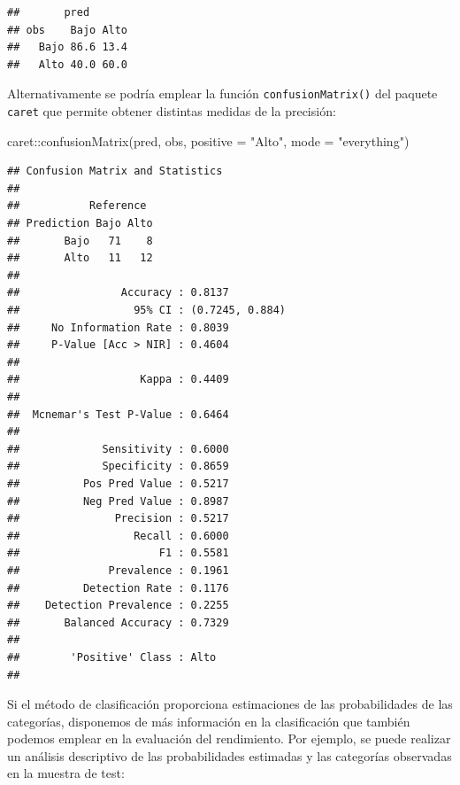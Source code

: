 \documentclass[
  spanish,
]{book}
\newenvironment{Shaded}{\begin{snugshade}}{\end{snugshade}}
\newcommand{\AttributeTok}[1]{\textcolor[rgb]{0.77,0.63,0.00}{#1}}
\newcommand{\FunctionTok}[1]{\textcolor[rgb]{0.00,0.00,0.00}{#1}}
\newcommand{\NormalTok}[1]{#1}
\newcommand{\SpecialCharTok}[1]{\textcolor[rgb]{0.00,0.00,0.00}{#1}}
\newcommand{\StringTok}[1]{\textcolor[rgb]{0.31,0.60,0.02}{#1}}
\theoremstyle{break}
\theoremstyle{definition}
\theoremstyle{definition}
\theoremstyle{definition}
\theoremstyle{definition}
\theoremstyle{remark}
\begin{document}
\begin{verbatim}
##       pred
## obs    Bajo Alto
##   Bajo 86.6 13.4
##   Alto 40.0 60.0
\end{verbatim}

Alternativamente se podría emplear la función \texttt{confusionMatrix()} del paquete \texttt{caret} que permite obtener distintas medidas de la precisión:

\begin{Shaded}
\begin{Highlighting}[]
\NormalTok{caret}\SpecialCharTok{::}\FunctionTok{confusionMatrix}\NormalTok{(pred, obs, }\AttributeTok{positive =} \StringTok{"Alto"}\NormalTok{, }\AttributeTok{mode =} \StringTok{"everything"}\NormalTok{)}
\end{Highlighting}
\end{Shaded}

\begin{verbatim}
## Confusion Matrix and Statistics
## 
##           Reference
## Prediction Bajo Alto
##       Bajo   71    8
##       Alto   11   12
##                                          
##                Accuracy : 0.8137         
##                  95% CI : (0.7245, 0.884)
##     No Information Rate : 0.8039         
##     P-Value [Acc > NIR] : 0.4604         
##                                          
##                   Kappa : 0.4409         
##                                          
##  Mcnemar's Test P-Value : 0.6464         
##                                          
##             Sensitivity : 0.6000         
##             Specificity : 0.8659         
##          Pos Pred Value : 0.5217         
##          Neg Pred Value : 0.8987         
##               Precision : 0.5217         
##                  Recall : 0.6000         
##                      F1 : 0.5581         
##              Prevalence : 0.1961         
##          Detection Rate : 0.1176         
##    Detection Prevalence : 0.2255         
##       Balanced Accuracy : 0.7329         
##                                          
##        'Positive' Class : Alto           
## 
\end{verbatim}

Si el método de clasificación proporciona estimaciones de las probabilidades de las categorías, disponemos de más información en la clasificación que también podemos emplear en la evaluación del rendimiento.
Por ejemplo, se puede realizar un análisis descriptivo de las probabilidades estimadas y las categorías observadas en la muestra de test:
\end{document}

